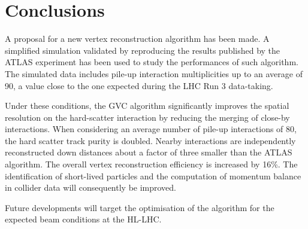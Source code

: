 \documentclass[a4paper,11pt]{article}
\begin{document}
\FloatBarrier

\section{Conclusions}
\label{sec:conclusions}

A proposal for a new vertex reconstruction algorithm has been made. A simplified simulation validated by reproducing the results published by the ATLAS experiment has been used to study the performances of such algorithm. The simulated data includes pile-up interaction multiplicities up to an average of 90, a value close to the one expected during the LHC Run 3 data-taking. 

Under these conditions, the GVC algorithm significantly improves the spatial resolution on the hard-scatter interaction by reducing the merging of close-by interactions. When considering an average number of pile-up interactions of 80, the hard scatter track purity is doubled. Nearby interactions are independently reconstructed down distances about a factor of three smaller than the ATLAS algorithm. The overall vertex reconstruction efficiency is increased by 16\%. The identification of short-lived particles and the computation of momentum balance in collider data will consequently be improved.

Future developments will target the optimisation of the algorithm for the expected beam conditions at the HL-LHC.





\end{document}
